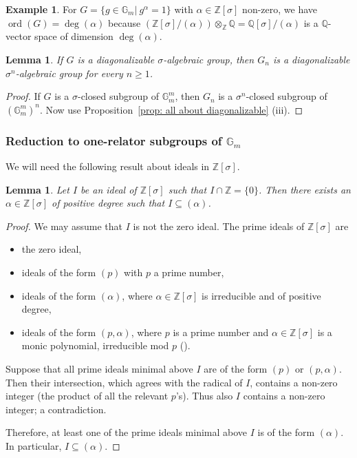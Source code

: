 \documentclass[oneside,reqno]{amsart}
\newtheorem{lemma}[theo]{Lemma}
\theoremstyle{definition}
\newtheorem{ex}[theo]{Example}
\newcommand{\ord}{\operatorname{ord}}
\newcommand{\s}{\sigma}
\newcommand{\Gm}{\mathbb{G}_m}
\newcommand{\ZZ}{\mathbb{Z}}
\begin{document}
\begin{ex}
	For $G=\{g\in\Gm|\ g^\alpha=1\}$ with $\alpha\in\ZZ[\s]$ non-zero, we have $\ord(G)=\deg(\alpha)$ because $(\ZZ[\s]/(\alpha))\otimes_\ZZ\mathbb{Q}=\mathbb{Q}[\s]/(\alpha)$ is a $\mathbb{Q}$-vector space of dimension $\deg(\alpha)$.
\end{ex}	


\begin{lemma} \label{lemma: Gn diagonalizable}
	If $G$ is a diagonalizable $\s$-algebraic group, then $G_n$ is a diagonalizable $\s^n$-algebraic group for every $n\geq 1$.
\end{lemma}	
\begin{proof}
	If $G$ is a $\s$-closed subgroup of $\Gm^m$, then $G_n$ is a $\s^n$-closed subgroup of $(\Gm^m)^n$. Now use Proposition~\ref{prop: all about diagonalizable} (iii).
\end{proof}	


\subsubsection{Reduction to one-relator subgroups of $\Gm$}

We will need the following result about ideals in $\ZZ[\s]$.

\begin{lemma} \label{lemma: exists onerelator ideal}
	Let $I$ be an ideal of $\ZZ[\s]$ such that $I\cap \ZZ=\{0\}$. Then there exists an $\alpha\in \ZZ[\s]$ of positive degree such that $I\subseteq (\alpha)$.
\end{lemma}	
\begin{proof}
	We may assume that $I$ is not the zero ideal.
	The prime ideals of $\ZZ[\s]$ are 
	\begin{itemize}
		\item the zero ideal,
		\item ideals of the form $(p)$ with $p$ a prime number,
		\item ideals of the form $(\alpha)$, where $\alpha\in\ZZ[\s]$ is irreducible and of positive degree,
		\item ideals of the form $(p,\alpha)$, where $p$ is a prime number and $\alpha\in\ZZ[\s]$ is a monic polynomial, irreducible mod $p$ (\cite[Chapter II, \S 1, Example H]{Mumford:TheRedBookfOfVarietiesAndSchemes}).
	\end{itemize}	
	Suppose that all prime ideals minimal above $I$ are of the form $(p)$ or $(p,\alpha)$. Then their intersection, which agrees with the radical of $I$, contains a non-zero integer (the product of all the relevant $p$'s). Thus also $I$ contains a non-zero integer; a contradiction.
	
	Therefore, at least one of the prime ideals minimal above $I$ is of the form $(\alpha)$. In particular, $I\subseteq (\alpha)$.
\end{proof}	
\end{document}
